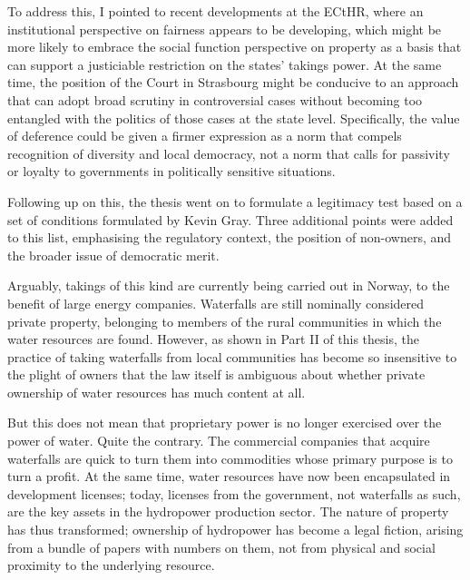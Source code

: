 {To address this, I pointed to recent developments at the ECtHR, where an institutional perspective on fairness appears to be developing, which might be more likely to embrace the social function perspective on property as a basis that can support a justiciable restriction on the states' takings power. At the same time, the position of the Court in Strasbourg might be conducive to an approach that can adopt broad scrutiny in controversial cases without becoming too entangled with the politics of those cases at the state level. Specifically, the value of deference could be given a firmer expression as a norm that compels recognition of diversity and local democracy, not a norm that calls for passivity or loyalty to governments in politically sensitive situations.

Following up on this, the thesis went on to formulate a legitimacy test based on a set of conditions formulated by Kevin Gray. Three additional points were added to this list, emphasising the regulatory context, the position of non-owners, and the broader issue of democratic merit. 
}

Arguably, takings of this kind are currently being carried out in Norway, to the benefit of large energy companies. Waterfalls are still nominally considered private property, belonging to members of the rural communities in which the water resources are found. However, as shown in Part II of this thesis, the practice of taking waterfalls from local communities has become so insensitive to the plight of owners that the law itself is ambiguous about whether private ownership of water resources has much content at all.


But this does not mean that proprietary power is no longer exercised over the power of water. Quite the contrary. The commercial companies that acquire waterfalls are quick to turn them into commodities whose primary purpose is to turn a profit. At the same time, water resources have now been encapsulated in development licenses; today, licenses from the government, not waterfalls as such, are the key assets in the hydropower production sector. The nature of property has thus transformed; ownership of hydropower has become a legal fiction, arising from a bundle of papers with numbers on them, not from physical and social proximity to the underlying resource.

